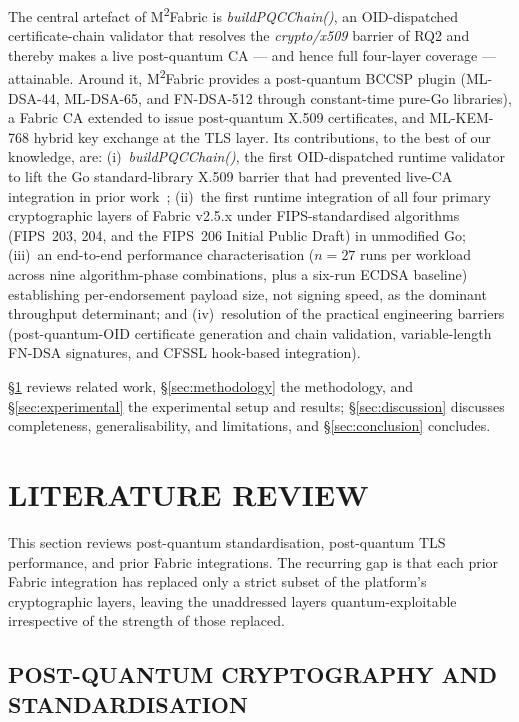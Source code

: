 \documentclass{ieeetj}
\newcommand{\mfabric}{M\textsuperscript{2}Fabric}
\begin{document}
The central artefact of \mfabric{} is \textit{buildPQCChain()}, an
OID-dispatched certificate-chain validator that resolves the
\textit{crypto/x509} barrier of RQ2 and thereby makes a live
post-quantum CA --- and hence full four-layer coverage --- attainable.
Around it, \mfabric{} provides a post-quantum BCCSP plugin (ML-DSA-44,
ML-DSA-65, and FN-DSA-512 through constant-time pure-Go libraries), a
Fabric CA extended to issue post-quantum X.509 certificates, and
ML-KEM-768 hybrid key exchange at the TLS layer. Its contributions,
to the best of our knowledge, are:
(i)~\textit{buildPQCChain()}, the first OID-dispatched runtime validator
to lift the Go standard-library X.509 barrier that had prevented
live-CA integration in prior
work~\cite{holcomb2021, hu2025prototype, abbas2025};
(ii)~the first runtime integration of all four primary cryptographic
layers of Fabric v2.5.x under FIPS-standardised algorithms (FIPS~203,
204, and the FIPS~206 Initial Public Draft) in unmodified Go;
(iii)~an end-to-end performance characterisation ($n=27$ runs per
workload across nine algorithm-phase combinations, plus a six-run ECDSA
baseline) establishing per-endorsement payload size, not signing speed,
as the dominant throughput determinant; and (iv)~resolution of the
practical engineering barriers (post-quantum-OID certificate generation
and chain validation, variable-length FN-DSA signatures, and CFSSL
hook-based integration).

\S\ref{sec:litreview} reviews related work,
\S\ref{sec:methodology} the methodology, and \S\ref{sec:experimental}
the experimental setup and results; \S\ref{sec:discussion} discusses
completeness, generalisability, and limitations, and
\S\ref{sec:conclusion} concludes.

\section{LITERATURE REVIEW} \label{sec:litreview}

This section reviews post-quantum standardisation, post-quantum TLS
performance, and prior Fabric integrations. The recurring gap is that
each prior Fabric integration has replaced only a strict subset of the
platform's cryptographic layers, leaving the unaddressed layers
quantum-exploitable irrespective of the strength of those replaced.

\subsection{POST-QUANTUM CRYPTOGRAPHY AND STANDARDISATION}
\end{document}
